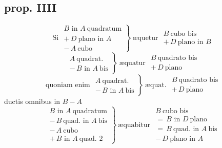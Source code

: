 \documentclass[11pt,a4paper]{article}
\begin{document}
\subsection*{prop. IIII}

\[ \text{Si } \left.\begin{array}{l} B \text{ in } A\ \text{quadratum} \\ +\,D\ \text{plano in } A \\ -\,A\ \text{cubo} \end{array}\right\}\ \text{æquetur } \begin{array}{l} B\ \text{cubo bis} \\ +\,D\ \text{plano in } B \end{array} \]
\[ \left.\begin{array}{l} A\ \text{quadrat.} \\ -\,B \text{ in } A\ \text{bis} \end{array}\right\}\ \text{æquatur } \begin{array}{l} B\ \text{quadrato bis} \\ +\,D\ \text{plano} \end{array} \]
\[ \text{quoniam enim } \left.\begin{array}{l} A\ \text{quadrat.} \\ -\,B \text{ in } A\ \text{bis} \end{array}\right\}\ \text{æquat. } \begin{array}{l} B\ \text{quadrato bis} \\ +\,D\ \text{plano} \end{array} \]
ductis omnibus in $B - A$
\[ \left.\begin{array}{l} B \text{ in } A\ \text{quadratum} \\ -\,B\ \text{quad. in } A\ \text{bis} \\ -\,A\ \text{cubo} \\ +\,B \text{ in } A\ \text{quad. } 2 \end{array}\right\}\ \text{æquabitur } \begin{array}{l} B\ \text{cubo bis} \\ =\,B \text{ in } D\ \text{plano} \\ =\,B\ \text{quad. in } A\ \text{bis} \\ -\,D\ \text{plano in } A \end{array} \]
\marginal{$\pm$}
\end{document}
